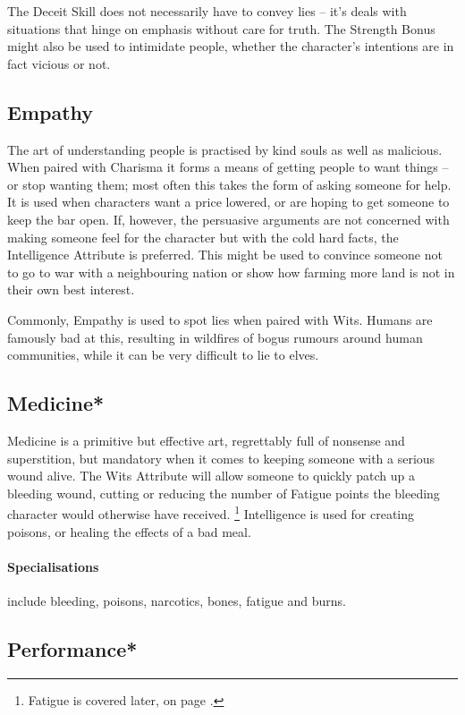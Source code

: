 \begin{multicols}{2}
The Deceit Skill does not necessarily have to convey lies -- it's deals with situations that hinge on emphasis without care for truth.
The Strength Bonus might also be used to intimidate people, whether the character's intentions are in fact vicious or not.

\subsection{Empathy}

The art of understanding people is practised by kind souls as well as malicious.
When paired with Charisma it forms a means of getting people to want things -- or stop wanting them; most often this takes the form of asking someone for help.
It is used when characters want a price lowered, or are hoping to get someone to keep the bar open.
If, however, the persuasive arguments are not concerned with making someone feel for the character but with the cold hard facts, the Intelligence Attribute is preferred.
This might be used to convince someone not to go to war with a neighbouring nation or show how farming more land is not in their own best interest.

Commonly, Empathy is used to spot lies when paired with Wits. Humans are famously bad at this, resulting in wildfires of bogus rumours around human communities, while it can be very difficult to lie to elves.

\subsection{Medicine*}

Medicine is a primitive but effective art, regrettably full of nonsense and superstition, but mandatory when it comes to keeping someone with a serious wound alive.
The Wits Attribute will allow someone to quickly patch up a bleeding wound, cutting or reducing the number of Fatigue points the bleeding character would otherwise have received.%
\footnote{Fatigue is covered later, on page \pageref{fatigue}.}
Intelligence is used for creating poisons, or healing the effects of a bad meal.

\paragraph{Specialisations} include bleeding, poisons, narcotics, bones, fatigue and burns.

\subsection{Performance*}


\end{multicols}
